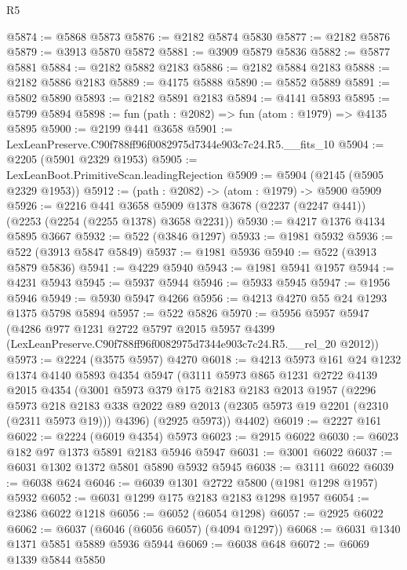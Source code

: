 \begin{lexlean}{R5}
\begin{coremodule}
@5874 := @5868 @5873
@5876 := @2182 @5874 @5830
@5877 := @2182 @5876
@5879 := @3913 @5870 @5872
@5881 := @3909 @5879 @5836
@5882 := @5877 @5881
@5884 := @2182 @5882 @2183
@5886 := @2182 @5884 @2183
@5888 := @2182 @5886 @2183
@5889 := @4175 @5888
@5890 := @5852 @5889
@5891 := @5802 @5890
@5893 := @2182 @5891 @2183
@5894 := @4141 @5893
@5895 := @5799 @5894
@5898 := fun (path : @2082) => fun (atom : @1979) => @4135 @5895
@5900 := @2199 @441 @3658
@5901 := LexLeanPreserve.C90f788ff96f0082975d7344e903c7c24.R5.__fits_10
@5904 := @2205 (@5901 @2329 @1953)
@5905 := LexLeanBoot.PrimitiveScan.leadingRejection
@5909 := @5904 (@2145 (@5905 @2329 @1953))
@5912 := (path : @2082) -> (atom : @1979) -> @5900 @5909
@5926 := @2216
    @441
    @3658
    @5909
    @1378
    @3678
    (@2237 (@2247 @441))
    (@2253 (@2254 (@2255 @1378) @3658 @2231))
@5930 := @4217 @1376 @4134 @5895 @3667
@5932 := @522 (@3846 @1297)
@5933 := @1981 @5932
@5936 := @522 (@3913 @5847 @5849)
@5937 := @1981 @5936
@5940 := @522 (@3913 @5879 @5836)
@5941 := @4229 @5940
@5943 := @1981 @5941 @1957
@5944 := @4231 @5943
@5945 := @5937 @5944
@5946 := @5933 @5945
@5947 := @1956 @5946
@5949 := @5930 @5947 @4266
@5956 := @4213 @4270 @55 @24 @1293 @1375 @5798 @5894
@5957 := @522 @5826
@5970 := @5956
    @5957
    @5947
    (@4286
      @977
      @1231
      @2722
      @5797
      @2015
      @5957
      @4399
      (LexLeanPreserve.C90f788ff96f0082975d7344e903c7c24.R5.__rel_20 @2012))
@5973 := @2224 (@3575 @5957) @4270
@6018 := @4213
    @5973
    @161
    @24
    @1232
    @1374
    @4140
    @5893
    @4354
    @5947
    (@3111
      @5973
      @865
      @1231
      @2722
      @4139
      @2015
      @4354
      (@3001
        @5973
        @379
        @175
        @2183
        @2183
        @2013
        @1957
        (@2296
          @5973
          @218
          @2183
          @338
          @2022
          @89
          @2013
          (@2305 @5973 @19 @2201 (@2310 (@2311 @5973 @19)))
          @4396)
        (@2925 @5973))
      @4402)
@6019 := @2227 @161
@6022 := @2224 (@6019 @4354) @5973
@6023 := @2915 @6022
@6030 := @6023 @182 @97 @1373 @5891 @2183 @5946 @5947
@6031 := @3001 @6022
@6037 := @6031 @1302 @1372 @5801 @5890 @5932 @5945
@6038 := @3111 @6022
@6039 := @6038 @624
@6046 := @6039 @1301 @2722 @5800 (@1981 @1298 @1957) @5932
@6052 := @6031 @1299 @175 @2183 @2183 @1298 @1957
@6054 := @2386 @6022 @1218
@6056 := @6052 (@6054 @1298)
@6057 := @2925 @6022
@6062 := @6037 (@6046 (@6056 @6057) (@4094 @1297))
@6068 := @6031 @1340 @1371 @5851 @5889 @5936 @5944
@6069 := @6038 @648
@6072 := @6069 @1339 @5844 @5850

\end{coremodule}
\end{lexlean}
